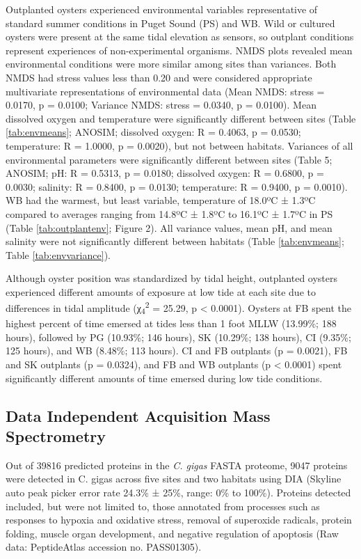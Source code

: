 \documentclass [11pt, proquest] {uwthesis}[2015/03/03]
\begin{document}
Outplanted oysters experienced environmental variables representative of standard summer conditions in Puget Sound (PS) and WB. Wild or cultured oysters were present at the same tidal elevation as sensors, so outplant conditions represent experiences of non-experimental organisms. NMDS plots revealed mean environmental conditions were more similar among sites than variances. Both NMDS had stress values less than 0.20 and were considered appropriate multivariate representations of environmental data (Mean NMDS: stress = 0.0170, p = 0.0100; Variance NMDS: stress = 0.0340, p = 0.0100). Mean dissolved oxygen and temperature were significantly different between sites (Table \ref{tab:envmeans}; ANOSIM; dissolved oxygen: R = 0.4063, p = 0.0530; temperature: R = 1.0000, p = 0.0020), but not between habitats. Variances of all environmental parameters were significantly different between sites (Table 5; ANOSIM; pH: R = 0.5313, p = 0.0180; dissolved oxygen: R = 0.6800, p = 0.0030; salinity: R = 0.8400, p = 0.0130; temperature: R = 0.9400, p = 0.0010). WB had the warmest, but least variable, temperature of 18.0ºC ± 1.3ºC compared to averages ranging from 14.8ºC ± 1.8ºC to 16.1ºC ± 1.7ºC in PS (Table \ref{tab:outplantenv}; Figure 2). All variance values, mean pH, and mean salinity were not significantly different between habitats (Table \ref{tab:envmeans}; Table \ref{tab:envvariance}).

Although oyster position was standardized by tidal height, outplanted oysters experienced different amounts of exposure at low tide at each site due to differences in tidal amplitude (χ\textsubscript{4}\textsuperscript{2} = 25.29, p \textless{} 0.0001). Oysters at FB spent the highest percent of time emersed at tides less than 1 foot MLLW (13.99\%; 188 hours), followed by PG (10.93\%; 146 hours), SK (10.29\%; 138 hours), CI (9.35\%; 125 hours), and WB (8.48\%; 113 hours). CI and FB outplants (p = 0.0021), FB and SK outplants (p = 0.0324), and FB and WB outplants (p \textless{} 0.0001) spent significantly different amounts of time emersed during low tide conditions.

\hypertarget{data-independent-acquisition-mass-spectrometry-1}{%
\subsection{Data Independent Acquisition Mass Spectrometry}\label{data-independent-acquisition-mass-spectrometry-1}}

Out of 39816 predicted proteins in the \emph{C. gigas} FASTA proteome, 9047 proteins were detected in C. gigas across five sites and two habitats using DIA (Skyline auto peak picker error rate 24.3\% ± 25\%, range: 0\% to 100\%). Proteins detected included, but were not limited to, those annotated from processes such as responses to hypoxia and oxidative stress, removal of superoxide radicals, protein folding, muscle organ development, and negative regulation of apoptosis (Raw data: PeptideAtlas accession no. PASS01305).
\end{document}
